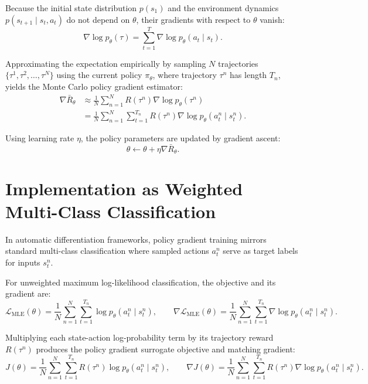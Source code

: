 \documentclass[11pt, a4paper]{article}
\begin{document}
Because the initial state distribution $p(s_1)$ and the environment dynamics $p(s_{t+1} \mid s_t, a_t)$ do not depend on $\theta$, their gradients with respect to $\theta$ vanish:
\begin{equation}\label{eq:pg-trajectory-score}
    \nabla \log p_\theta(\tau) = \sum_{t=1}^{T} \nabla \log p_\theta(a_t \mid s_t).
\end{equation}

Approximating the expectation empirically by sampling $N$ trajectories $\{\tau^1, \tau^2, \dots, \tau^N\}$ using the current policy $\pi_\theta$, where trajectory $\tau^n$ has length $T_n$, yields the Monte Carlo policy gradient estimator:
\begin{align}
    \nabla \bar{R}_\theta &\approx \frac{1}{N} \sum_{n=1}^{N} R(\tau^n) \nabla \log p_\theta(\tau^n) \nonumber \\
    &= \frac{1}{N} \sum_{n=1}^{N} \sum_{t=1}^{T_n} R(\tau^n) \nabla \log p_\theta(a_t^n \mid s_t^n).\label{eq:pg-monte-carlo-gradient}
\end{align}

Using learning rate $\eta$, the policy parameters are updated by gradient ascent:
\begin{equation}\label{eq:pg-gradient-ascent}
    \theta \leftarrow \theta + \eta \nabla \bar{R}_\theta.
\end{equation}

\section{Implementation as Weighted Multi-Class Classification}

In automatic differentiation frameworks, policy gradient training mirrors standard multi-class classification where sampled actions $a_t^n$ serve as target labels for inputs $s_t^n$.

For unweighted maximum log-likelihood classification, the objective and its gradient are:
\begin{equation}\label{eq:pg-maximum-likelihood}
    \mathcal{L}_{\text{MLE}}(\theta) = \frac{1}{N} \sum_{n=1}^{N} \sum_{t=1}^{T_n} \log p_\theta(a_t^n \mid s_t^n), \qquad
    \nabla \mathcal{L}_{\text{MLE}}(\theta) = \frac{1}{N} \sum_{n=1}^{N} \sum_{t=1}^{T_n} \nabla \log p_\theta(a_t^n \mid s_t^n).
\end{equation}

Multiplying each state-action log-probability term by its trajectory reward $R(\tau^n)$ produces the policy gradient surrogate objective and matching gradient:
\begin{equation}\label{eq:pg-weighted-log-likelihood}
    J(\theta) = \frac{1}{N} \sum_{n=1}^{N} \sum_{t=1}^{T_n} R(\tau^n) \log p_\theta(a_t^n \mid s_t^n), \qquad
    \nabla J(\theta) = \frac{1}{N} \sum_{n=1}^{N} \sum_{t=1}^{T_n} R(\tau^n) \nabla \log p_\theta(a_t^n \mid s_t^n).
\end{equation}
\end{document}

